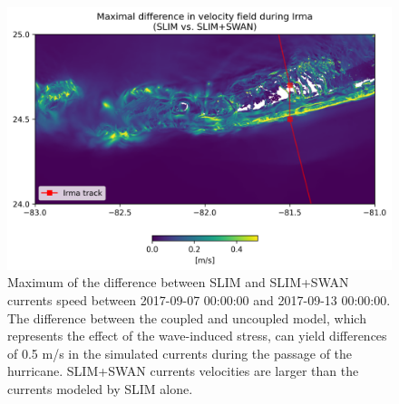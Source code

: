 \documentclass[11pt,a4paper]{article}
\begin{document}
\begin{figure}
    \centering
    \includegraphics[width=.95\textwidth]{fig/max_diff_ww3.png}
    \caption{Maximum of the difference between SLIM and SLIM+SWAN currents speed between 2017-09-07 00:00:00 and 2017-09-13 00:00:00. The difference between the coupled and uncoupled model, which represents the effect of the wave-induced stress, can yield differences of 0.5 m/s in the simulated currents during the passage of the hurricane. SLIM+SWAN currents velocities are larger than the currents modeled by SLIM alone.}
    \label{fig:diff}
\end{figure}
\end{document}
